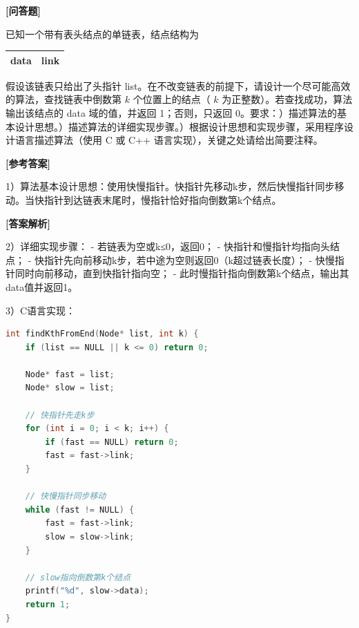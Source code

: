 \documentclass[12pt,a4paper]{article}
\newenvironment{choicequestion}[1][]{%
    \vspace{0.5cm}
    \noindent\textbf{[#1]}
    \vspace{0.2cm}
}{}
\newenvironment{answersection}{%
    \vspace{0.2cm}
    \noindent\textbf{[参考答案]}\\
    \vspace{0.1cm}
}{}
\newenvironment{analysissection}{%
    \vspace{0.2cm}
    \noindent\textbf{[答案解析]}\\
    \vspace{0.1cm}
}{}
\newcounter{questioncounter}
\newcommand{\question}[2]{%
    \stepcounter{questioncounter}%
    \noindent\textbf{\thequestioncounter} #1%
}
\begin{document}
\begin{choicequestion}[问答题]
\question{已知一个带有表头结点的单链表，结点结构为
\begin{table}[h]
\centering
\begin{tabular}{|c|c|}
\hline
data & link \\
\hline
\end{tabular}
\end{table}
假设该链表只给出了头指针 list。在不改变链表的前提下，请设计一个尽可能高效的算法，查找链表中倒数第 $k$ 个位置上的结点（ $k$ 为正整数）。若查找成功，算法输出该结点的 data 域的值，并返回 1；否则，只返回 0。要求：\newline
1）描述算法的基本设计思想。\newline
2）描述算法的详细实现步骤。\newline
3）根据设计思想和实现步骤，采用程序设计语言描述算法（使用 C 或 C++ 语言实现），关键之处请给出简要注释。}{}

\begin{answersection}
1）算法基本设计思想：使用快慢指针。快指针先移动k步，然后快慢指针同步移动。当快指针到达链表末尾时，慢指针恰好指向倒数第k个结点。
\end{answersection}

\begin{analysissection}
2）详细实现步骤：
- 若链表为空或k≤0，返回0；
- 快指针和慢指针均指向头结点；
- 快指针先向前移动k步，若中途为空则返回0（k超过链表长度）；
- 快慢指针同时向前移动，直到快指针指向空；
- 此时慢指针指向倒数第k个结点，输出其data值并返回1。

3）C语言实现：
\begin{lstlisting}[language=C]
int findKthFromEnd(Node* list, int k) {
    if (list == NULL || k <= 0) return 0;
    
    Node* fast = list;
    Node* slow = list;
    
    // 快指针先走k步
    for (int i = 0; i < k; i++) {
        if (fast == NULL) return 0;
        fast = fast->link;
    }
    
    // 快慢指针同步移动
    while (fast != NULL) {
        fast = fast->link;
        slow = slow->link;
    }
    
    // slow指向倒数第k个结点
    printf("%d", slow->data);
    return 1;
}
\end{lstlisting}
\end{analysissection}
\end{choicequestion}
\end{document}
